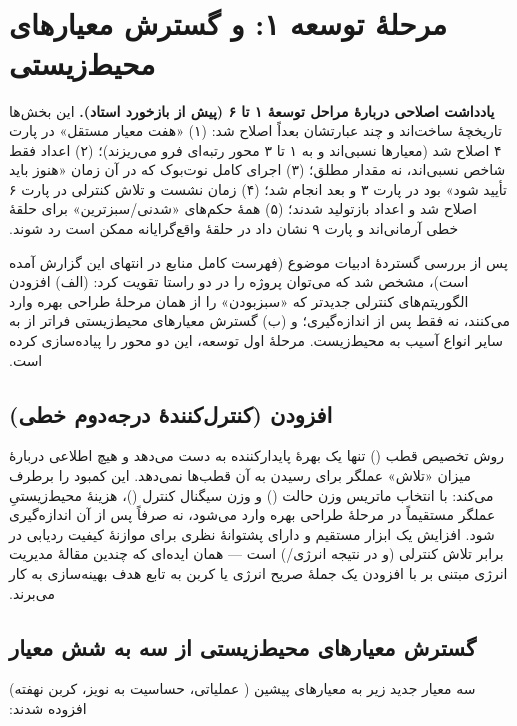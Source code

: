 ‫\documentclass[a4paper,12pt]{article}
\begin{document}
‫
‫\section{مرحلهٔ توسعه ۱:  و گسترش معیارهای محیط‌زیستی}
‫\textbf{یادداشت اصلاحی دربارهٔ مراحل توسعهٔ ۱ تا ۶ (پیش از بازخورد استاد).} این بخش‌ها تاریخچهٔ ساخت‌اند و چند عبارتشان بعداً اصلاح شد: (۱) «هفت معیار مستقل» در پارت ۴ اصلاح شد (معیارها نسبی‌اند و به ۱ تا ۳ محور رتبه‌ای فرو می‌ریزند)؛ (۲) اعداد  فقط شاخص نسبی‌اند، نه مقدار مطلق؛ (۳) اجرای کامل نوت‌بوک که در آن زمان «هنوز باید تأیید شود» بود در پارت ۳ و بعد انجام شد؛ (۴) زمان نشست و تلاش کنترلی در پارت ۶ اصلاح شد و اعداد بازتولید شدند؛ (۵) همهٔ حکم‌های «شدنی/سبزترین» برای حلقهٔ خطی آرمانی‌اند و پارت ۹ نشان داد در حلقهٔ واقع‌گرایانه ممکن است رد شوند.

‫پس از بررسی گستردهٔ ادبیات موضوع (فهرست کامل منابع در انتهای این گزارش
‫آمده است)، مشخص شد که می‌توان پروژه را در دو راستا تقویت کرد: (الف)
‫افزودن الگوریتم‌های کنترلی جدیدتر که «سبزبودن» را از همان مرحلهٔ طراحی
‫بهره وارد می‌کنند، نه فقط پس از اندازه‌گیری؛ و (ب) گسترش معیارهای
‫محیط‌زیستی فراتر از  به سایر انواع آسیب به محیط‌زیست. مرحلهٔ
‫اول توسعه، این دو محور را پیاده‌سازی کرده است.
‫
‫\subsection{افزودن  (کنترل‌کنندهٔ درجه‌دوم خطی)}
‫روش تخصیص قطب () تنها یک بهرهٔ پایدارکننده به
‫دست می‌دهد و هیچ اطلاعی دربارهٔ میزان «تلاش» عملگر برای رسیدن به آن
‫قطب‌ها نمی‌دهد.  این کمبود را برطرف می‌کند: با انتخاب ماتریس
‫وزن حالت () و وزن سیگنال کنترل ()، هزینهٔ محیط‌زیستیِ
‫عملگر مستقیماً در مرحلهٔ طراحی بهره وارد می‌شود، نه صرفاً پس از آن
‫اندازه‌گیری شود. افزایش  یک ابزار مستقیم و دارای پشتوانهٔ
‫نظری برای موازنهٔ کیفیت ردیابی در برابر تلاش کنترلی (و در نتیجه
‫انرژی/) است — همان ایده‌ای که چندین مقالهٔ مدیریت انرژی
‫مبتنی بر  با افزودن یک جملهٔ صریح انرژی یا کربن به تابع هدف
‫بهینه‌سازی به کار می‌برند.
‫
‫\subsection{گسترش معیارهای محیط‌زیستی از سه به شش معیار}
‫سه معیار جدید زیر به معیارهای پیشین ( عملیاتی، حساسیت به
‫نویز، کربن نهفته) افزوده شدند:
‫
\end{document}
